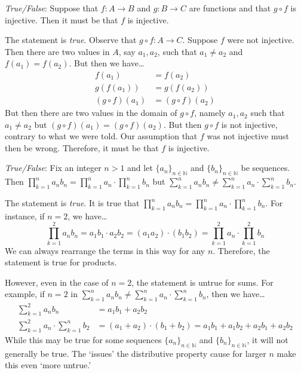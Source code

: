 \documentclass[11pt,letterpaper]{article}
\begin{document}
\newpage




\quizsol \textit{True/False}: Suppose that $f: A \to B$ and $g: B \to C$ are functions and that $g \circ f$ is injective. Then it must be that $f$ is injective. \pspace

\sol The statement is \textit{true}. Observe that $g \circ f: A \to C$. Suppose $f$ were not injective. Then there are two values in $A$, say $a_1, a_2$, such that $a_1 \neq a_2$ and $f(a_1)= f(a_2)$. But then we have\dots
	\[
	\begin{aligned}
	f(a_1)&= f(a_2) \\
	g(f(a_1))&= g(f(a_2)) \\
	(g \circ f)(a_1)&= (g \circ f)(a_2)
	\end{aligned}
	\] 
But then there are two values in the domain of $g \circ f$, namely $a_1, a_2$ such that $a_1 \neq a_2$ but $(g \circ f)(a_1)= (g \circ f)(a_2)$. But then $g \circ f$ is not injective, contrary to what we were told. Our assumption that $f$ was not injective must then be wrong. Therefore, it must be that $f$ is injective. \pvspace{1.5cm}



\quizsol \textit{True/False}: Fix an integer $n > 1$ and let $\{ a_n \}_{n \in \mathbb{N}}$ and $\{ b_n \}_{n \in \mathbb{N}}$ be sequences. Then $\displaystyle \prod_{k=1}^n a_n b_n= \prod_{k=1}^n a_n \cdot \prod_{k=1}^n b_n$ but $\displaystyle \sum_{k=1}^n a_n b_n \neq \sum_{k=1}^n a_n \cdot \sum_{k=1}^n b_n$. \pspace

\sol The statement is \textit{true}. It is true that $\displaystyle \prod_{k=1}^n a_n b_n= \prod_{k=1}^n a_n \cdot \prod_{k=1}^n b_n$. For instance, if $n=2$, we have\dots
	\[
	\prod_{k=1}^2 a_n b_n= a_1 b_1 \cdot a_2 b_2= (a_1 a_2) \cdot (b_1 b_2)= \prod_{k=1}^2 a_n \cdot \prod_{k=1}^2 b_n
	\]
We can always rearrange the terms in this way for any $n$. Therefore, the statement is true for products. \pspace

However, even in the case of $n= 2$, the statement is untrue for sums. For example, if $n= 2$ in $\displaystyle \sum_{k=1}^n a_n b_n \neq \sum_{k=1}^n a_n \cdot \sum_{k=1}^n b_n$, then we have\dots
	\[
	\begin{aligned}
	\sum_{k=1}^2 a_n b_n&= a_1b_1 + a_2b_2 \\[0.3cm]
	\sum_{k=1}^2 a_n \cdot \sum_{k=1}^n b_2&= (a_1 + a_2) \cdot (b_1 + b_2)= a_1b_1 + a_1b_2 + a_2b_1 + a_2 b_2
	\end{aligned}
	\]
While this may be true for some sequences $\{ a_n \}_{n \in \mathbb{N}}$ and $\{ b_n \}_{n \in \mathbb{N}}$, it will not generally be true. The `issues' the distributive property cause for larger $n$ make this even `more untrue.' 
\end{document}
